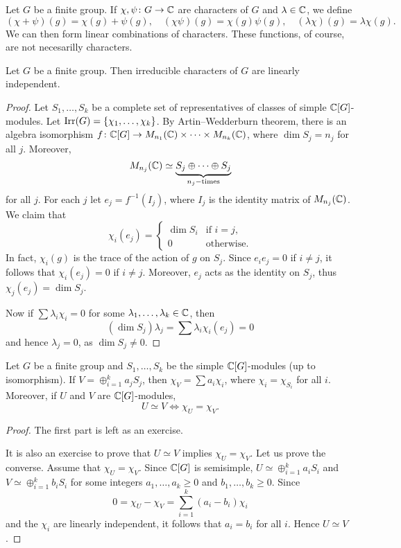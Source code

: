 Let $G$ be a finite group. If $\chi,\psi\colon G\to\mathbb{C}$ are
characters of $G$ and $\lambda\in\mathbb{C}$, we define 
\[
    (\chi+\psi)(g)=\chi(g)+\psi(g),
    \quad
    (\chi\psi)(g)=\chi(g)\psi(g),
    \quad
    (\lambda\chi)(g)=\lambda\chi(g).
\]
We can then form linear combinations of characters. These functions, of course, are not necesarilly 
characters. 

\begin{theorem}
    Let $G$ be a finite group. Then irreducible characters of $G$
    are linearly independent. 
\end{theorem}

\begin{proof}
    Let $S_1,\dots,S_k$ be a complete set of representatives of 
    classes of 
    simple $\mathbb{C}[G]$-modules. Let 
    $\operatorname{Irr}(G)=\{\chi_1,\dots,\chi_k\}$. 
    By Artin--Wedderburn theorem, there is 
    an algebra isomorphism 
    $f\colon \mathbb{C}[G]\to M_{n_1}(\mathbb{C})\times\cdots\times M_{n_k}(\mathbb{C})$, 
    where $\dim S_j=n_j$ for all $j$. Moreover, 
    \[
    M_{n_j}(\mathbb{C})\simeq \underbrace{S_j\oplus\cdots\oplus S_j}_{n_j-\text{times}}
    \]
    for all $j$. For each $j$ let $e_j=f^{-1}(I_j)$, where
    $I_j$ is the identity matrix of $M_{n_j}(\mathbb{C})$. We claim that 
    \[
        \chi_i(e_j)=\begin{cases}
            \dim S_i & \text{if $i=j$,}\\
            0 & \text{otherwise}.
            \end{cases}
    \]
    In fact, $\chi_i(g)$ is the trace of the action of $g$ on $S_j$. Since 
    $e_ie_j=0$ if $i\ne j$, it follows that 
    $\chi_i(e_j)=0$ if $i\ne j$. Moreover, $e_j$ acts as the identity on $S_j$, thus
    $\chi_j(e_j)=\dim S_j$. 
    
    Now if $\sum\lambda_i\chi_i=0$ for some $\lambda_1,\dots,\lambda_k\in\mathbb{C}$, then
    \[
    (\dim S_j)\lambda_j=\sum\lambda_i\chi_i(e_j)=0
    \]
    and hence $\lambda_j=0$, as $\dim S_j\ne 0$. 
\end{proof}

\begin{theorem}
    Let $G$ be a finite group and $S_1,\dots,S_k$ be the simple
    $\mathbb{C}[G]$-modules (up to isomorphism). If $V=\oplus_{i=1}^k a_jS_j$, then
    $\chi_V=\sum a_i\chi_i$, where 
    $\chi_i=\chi_{S_i}$ for all $i$. Moreover, if $U$ and $V$ 
    are $\mathbb{C}[G]$-modules, 
    \[
    U\simeq V\Longleftrightarrow \chi_U=\chi_V.
    \]
\end{theorem}

\begin{proof}
    The first part is left as an exercise. 
    
    It is also an exercise to prove that $U\simeq V$ implies $\chi_U=\chi_V$. Let us prove
    the converse. Assume that $\chi_U=\chi_V$. Since $\mathbb{C}[G]$ is semisimple, 
    $U\simeq\oplus_{i=1}^k a_iS_i$ and 
    $V\simeq\oplus_{i=1}^k b_iS_i$ for some integers 
    $a_1,\dots,a_k\geq0$ and $b_1,\dots,b_k\geq0$. Since 
    \[
    0=\chi_U-\chi_V=\sum_{i=1}^k (a_i-b_i)\chi_i
    \]
    and the $\chi_i$ are linearly independent, it follows that
    $a_i=b_i$ for all $i$. Hence $U\simeq V$. 
\end{proof}

